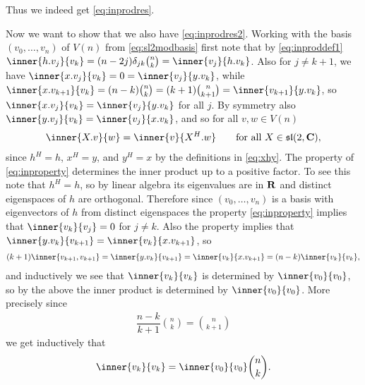 Thus we indeed get \cref{eq:inprodres}.

Now we want to show that we also have \cref{eq:inprodres2}. Working with the basis $(v_0,\dotsc,v_n)$ of $V(n)$ from \cref{eq:sl2modbasis} first note that by \cref{eq:inproddef1} $\inner{h.v_j}{v_k}=(n-2j)\delta_{jk}\binom{n}{k}=\inner{v_j}{h.v_k}$. Also for $j\neq k+1$, we have $\inner{x.v_j}{v_k}=0=\inner{v_j}{y.v_k}$, while $\inner{x.v_{k+1}}{v_k}=(n-k)\binom{n}{k}=(k+1)\binom{n}{k+1}=\inner{v_{k+1}}{y.v_k}$, so $\inner{x.v_j}{v_k}=\inner{v_j}{y.v_k}$ for all $j$. By symmetry also $\inner{y.v_j}{v_k}=\inner{v_j}{x.v_k}$, and so for all $v,w\in V(n)$
\begin{align}\label{eq:inproperty}
  \inner{X.v}{w} = \inner{v}{X^H.w} \qquad \mbox{for all $X\in\slc$},
\end{align}
since $h^H=h$, $x^H=y$, and $y^H=x$ by the definitions in \cref{eq:xhy}. The property of \cref{eq:inproperty} determines the inner product up to a positive factor. To see this note that $h^H=h$, so by linear algebra its eigenvalues are in $\mathbf{R}$ and distinct eigenspaces of $h$ are orthogonal. Therefore since $(v_0,\dotsc,v_n)$ is a basis with eigenvectors of $h$ from distinct eigenspaces the property \cref{eq:inproperty} implies that $\inner{v_k}{v_j}=0$ for $j\neq k$. Also the property implies that $\inner{y.v_k}{v_{k+1}}=\inner{v_k}{x.v_{k+1}}$, so
\begin{align*}
  (k+1)\inner{v_{k+1},v_{k+1}} = \inner{y.v_k}{v_{k+1}} = \inner{v_k}{x.v_{k+1}} = (n-k)\inner{v_k}{v_k},
\end{align*}
and inductively we see that $\inner{v_k}{v_k}$ is determined by $\inner{v_0}{v_0}$, so by the above the inner product is determined by $\inner{v_0}{v_0}$. More precisely since 
\begin{align*}
  \dfrac{n-k}{k+1}\binom{n}{k} = \binom{n}{k+1}
\end{align*}
we get inductively that
\begin{align*}
  \inner{v_k}{v_k} = \inner{v_0}{v_0}\binom{n}{k}.
\end{align*}


